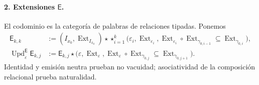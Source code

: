 \paragraph{2. Extensiones \(\mathsf E\).}
El codominio es la categoría de palabras de relaciones tipadas. Ponemos
\begin{align}
 \mathsf E_{k,k}
 &:=(I_{x_0},\operatorname{Ext}_{I_{x_0}})\star
 \mathop{\star}_{i=1}^{k}
 \bigl(\varepsilon_i,\operatorname{Ext}_{\varepsilon_i},
 \operatorname{Ext}_{\varepsilon_i}\circ
 \operatorname{Ext}_{\gamma_{0,i-1}}
 \subseteq\operatorname{Ext}_{\gamma_{0,i}}\bigr),
 \label{eq:pdfv2-terminal-semilla-e}\\
 \operatorname{Upd}^{\mathsf E}_{\varepsilon}\mathsf E_{k,j}
 &:=
 \mathsf E_{k,j}\star
 \bigl(\varepsilon,\operatorname{Ext}_{\varepsilon},
 \operatorname{Ext}_{\varepsilon}\circ
 \operatorname{Ext}_{\gamma_{0,j}}
 \subseteq\operatorname{Ext}_{\gamma_{0,j+1}}\bigr).
 \label{eq:pdfv2-terminal-update-e}
\end{align}
Identidad y emisión neutra prueban no vacuidad; asociatividad de la
composición relacional prueba naturalidad.


